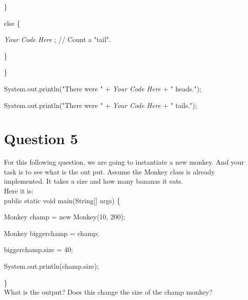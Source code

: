 \documentclass[11pt, oneside]{article}   	%
\begin{document}
\hspace{4ex} \}
                 
\hspace{4ex} else \{
             
\hspace{8ex} \textit{Your Code Here} ;   // Count a "tail".
                 
\hspace{4ex} \}

\}
          
System.out.println("There were " + \textit{Your Code Here} + " heads.");
          
System.out.println("There were " + \textit{Your Code Here} + " tails.");
          
 \section*{Question 5}
 For this following question, we are going to instantiate a new monkey. And your task is to see what is the out put. Assume the Monkey class is already implemented. It takes a size and how many bananas it eats.\\
 
  Here it is: \\
  
 public static void main(String[] args) \{ 
 
 \hspace{4ex} Monkey champ = new Monkey(10, 200);
          
 \hspace{4ex} Monkey biggerchamp = champ;
 
 \hspace{4ex} biggerchamp.size = 40; 
 
 \hspace{4ex} System.out.println(champ.size); 
 
 \} \\ \newline What is the output? Does this change the size of the champ monkey?\\
          
\end{document}
